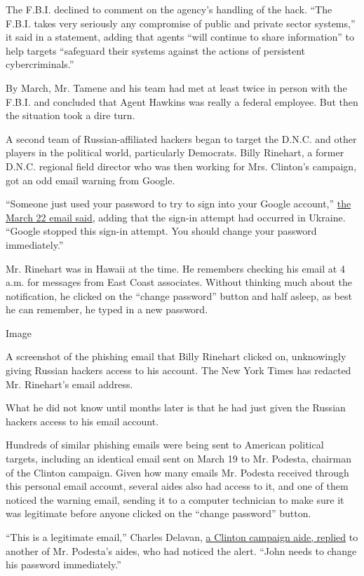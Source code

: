 The F.B.I. declined to comment on the agency's handling of the hack.
``The F.B.I. takes very seriously any compromise of public and private
sector systems,'' it said in a statement, adding that agents ``will
continue to share information'' to help targets ``safeguard their
systems against the actions of persistent cybercriminals.''

By March, Mr. Tamene and his team had met at least twice in person with
the F.B.I. and concluded that Agent Hawkins was really a federal
employee. But then the situation took a dire turn.

A second team of Russian-affiliated hackers began to target the D.N.C.
and other players in the political world, particularly Democrats. Billy
Rinehart, a former D.N.C. regional field director who was then working
for Mrs. Clinton's campaign, got an odd email warning from Google.

``Someone just used your password to try to sign into your Google
account,''
\href{http://www.documentcloud.org/documents/3237163-Rinehart-Hacking-Email.html}{the
March 22 email said}, adding that the sign-in attempt had occurred in
Ukraine. ``Google stopped this sign-in attempt. You should change your
password immediately.''

Mr. Rinehart was in Hawaii at the time. He remembers checking his email
at 4 a.m. for messages from East Coast associates. Without thinking much
about the notification, he clicked on the ``change password'' button and
half asleep, as best he can remember, he typed in a new password.

Image

A screenshot of the phishing email that Billy Rinehart clicked on,
unknowingly giving Russian hackers access to his account. The New York
Times has redacted Mr. Rinehart's email address.

What he did not know until months later is that he had just given the
Russian hackers access to his email account.

Hundreds of similar phishing emails were being sent to American
political targets, including an identical email sent on March 19 to Mr.
Podesta, chairman of the Clinton campaign. Given how many emails Mr.
Podesta received through this personal email account, several aides also
had access to it, and one of them noticed the warning email, sending it
to a computer technician to make sure it was legitimate before anyone
clicked on the ``change password'' button.

``This is a legitimate email,'' Charles Delavan,
\href{https://wikileaks.org/podesta-emails/emailid/34899}{a Clinton
campaign aide, replied} to another of Mr. Podesta's aides, who had
noticed the alert. ``John needs to change his password immediately.''


